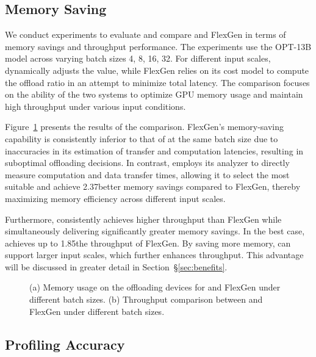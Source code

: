 \subsection{Memory Saving}
\label{sec:memsave}

We conduct experiments to evaluate and compare \sys and FlexGen in terms of memory savings and throughput performance. 
The experiments use the OPT-13B model across varying batch sizes {4, 8, 16, 32}. 
For different input scales, \sys dynamically adjusts the \interval value, while FlexGen relies on its cost model to compute the offload ratio in an attempt to minimize total latency. 
The comparison focuses on the ability of the two systems to optimize GPU memory usage and maintain high throughput under various input conditions.

Figure~\ref{fig:eval2} presents the results of the comparison. 
FlexGen's memory-saving capability is consistently inferior to that of \sys at the same batch size due to inaccuracies in its estimation of transfer and computation latencies, 
resulting in suboptimal offloading decisions. In contrast, \sys employs its analyzer to directly measure computation and data transfer times, allowing it to select the most suitable \interval and achieve 2.37\X better memory savings compared to FlexGen, thereby maximizing memory efficiency across different input scales.

Furthermore, \sys consistently achieves higher throughput than FlexGen while simultaneously delivering significantly greater memory savings. 
In the best case, \sys achieves up to 1.85\X the throughput of FlexGen. By saving more memory, \sys can support larger input scales, which further enhances throughput. 
This advantage will be discussed in greater detail in Section~\S\ref{sec:benefits}.

\begin{figure}[t]
    \centering
    \resizebox{\columnwidth}{!}{
 }
    \caption{(a) Memory usage on the offloading devices for \sys and FlexGen under different batch sizes. 
 (b) Throughput comparison between \sys and FlexGen under different batch sizes.}
    \label{fig:eval2}
\end{figure}


\subsection{Profiling Accuracy}


